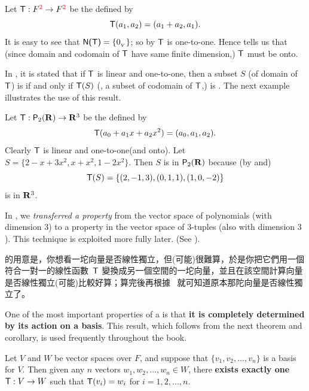 \begin{example} \label{example 2.1.12}
Let \(\T : F^{\RED{2}} \to F^{\RED{2}}\) be the \LTRAN{} defined by
\[
    \textsf{T}(a_1, a_2) = (a_1 + a_2, a_1).
\]
It is easy to see that \(\textsf{N(T)} = \{ 0_{_V} \}\);
so by  \(\textsf{T}\) is one-to-one.
Hence  tells us that (since domain and codomain of \(\textsf{T}\) have same finite dimension,) \(\textsf{T}\) must be onto.
\end{example}

\begin{note}
In , it is stated that if \(\textsf{T}\) is linear and one-to-one, then a subset \(S\) (of domain of \(\textsf{T}\)) is \LID{} if and only if \(\textsf{T}(S)\) (, a subset of codomain of \(\textsf{T}\),) is \LID{}.
The next example illustrates the use of this result.
\end{note}

\begin{example} \label{example 2.1.13}
Let \(\textsf{T} : \textsf{P}_2(\mathbf{R}) \to \mathbf{R}^3\) be the \LTRAN{} defined by
\[
    \textsf{T}(a_0 + a_1 x + a_2 x^2) = (a_0, a_1, a_2).
\]
Clearly \(\textsf{T}\) is linear and one-to-one(and onto).
Let \(S = \{ 2 - x + 3x^2, x + x^2, 1 - 2x^2 \}\).
Then \(S\) is \LID{} in \(\textsf{P}_2(\mathbf{R})\) because (by  and)
\[
    \textsf{T}(S) = \{ (2, -1, 3), (0, 1, 1), (1, 0, -2) \}
\]
is \LID{} in \(\mathbf{R}^3\).
\end{example}

\begin{remark} \label{remark 2.1.11}
In , we \emph{transferred a property} from the vector space of polynomials (with dimension \(3\)) to a property in the vector space of \(3\)-tuples (also with dimension \(3\)).
This technique is exploited more fully later.
(See ).
\end{remark}

\begin{note}
 的用意是，你想看一坨向量是否線性獨立，但(可能)很難算，於是你把它們用一個符合一對一的線性函數\ \(\textsf{T}\) 變換成另一個空間的一坨向量，並且在該空間計算向量是否線性獨立(可能)比較好算；算完後再根據\  就可知道原本那陀向量是否線性獨立了。
\end{note}

One of the most important properties of a \LTRAN{} is that \textbf{it is completely determined by its action on a basis}.
This result, which follows from the next theorem and corollary, is used frequently throughout the book.

\begin{theorem} \label{thm 2.6}
Let \(V\) and \(W\) be vector spaces over \(F\), and suppose that \(\{ v_1, v_2, ..., v_n \}\) is a basis for \(V\).
Then given any \(n\) vectors \(w_1, w_2, ..., w_n \in W\), there \textbf{exists exactly one} \LTRAN{} \(\textsf{T} : V \to W\) such that \(\textsf{T}(v_i) = w_i\) for \(i= 1, 2, ..., n\).
\end{theorem}

